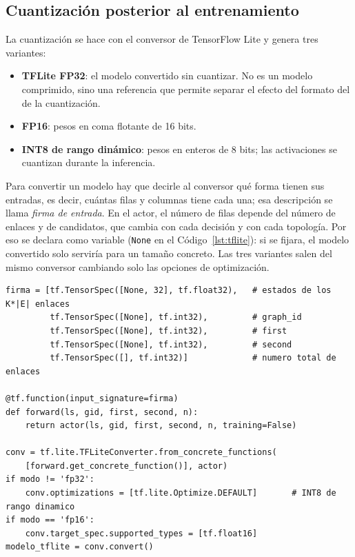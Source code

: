 \subsection{Cuantización posterior al entrenamiento}\label{sec:flujo_cuantizacion}

La cuantización se hace con el conversor de TensorFlow Lite y genera tres variantes:
\begin{itemize}
	\item \textbf{TFLite FP32}: el modelo convertido sin cuantizar. No es un modelo comprimido, sino una referencia que permite separar el efecto del formato del de la cuantización.
	\item \textbf{FP16}: pesos en coma flotante de 16 bits.
	\item \textbf{INT8 de rango dinámico}: pesos en enteros de 8 bits; las activaciones se cuantizan durante la inferencia.
\end{itemize}

Para convertir un modelo hay que decirle al conversor qué forma tienen sus entradas, es decir, cuántas filas y columnas tiene cada una; esa descripción se llama \emph{firma de entrada}. En el actor, el número de filas depende del número de enlaces y de candidatos, que cambia con cada decisión y con cada topología. Por eso se declara como variable (\texttt{None} en el Código~\ref{lst:tflite}): si se fijara, el modelo convertido solo serviría para un tamaño concreto. Las tres variantes salen del mismo conversor cambiando solo las opciones de optimización.

\begin{lstlisting}[style=Python, caption={[Conversión del actor a TensorFlow Lite]Conversión del actor a TensorFlow Lite (\texttt{quantize\_v2.py}, simplificado).}, label=lst:tflite]
firma = [tf.TensorSpec([None, 32], tf.float32),   # estados de los K*|E| enlaces
         tf.TensorSpec([None], tf.int32),         # graph_id
         tf.TensorSpec([None], tf.int32),         # first
         tf.TensorSpec([None], tf.int32),         # second
         tf.TensorSpec([], tf.int32)]             # numero total de enlaces

@tf.function(input_signature=firma)
def forward(ls, gid, first, second, n):
    return actor(ls, gid, first, second, n, training=False)

conv = tf.lite.TFLiteConverter.from_concrete_functions(
    [forward.get_concrete_function()], actor)
if modo != 'fp32':
    conv.optimizations = [tf.lite.Optimize.DEFAULT]       # INT8 de rango dinamico
if modo == 'fp16':
    conv.target_spec.supported_types = [tf.float16]
modelo_tflite = conv.convert()
\end{lstlisting}

